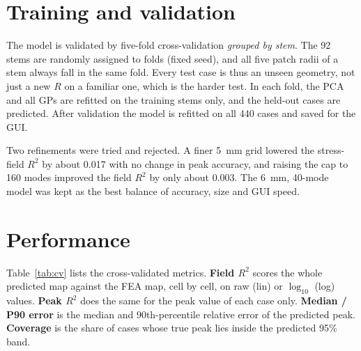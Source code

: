 \documentclass[11pt,a4paper]{article}
\begin{document}
\section{Training and validation}

The model is validated by five-fold cross-validation \emph{grouped by stem}. The 92 stems are randomly assigned to folds (fixed seed), and all five patch radii of a stem always fall in the same fold. Every test case is thus an unseen geometry, not just a new $R$ on a familiar one, which is the harder test. In each fold, the PCA and all GPs are refitted on the training stems only, and the held-out cases are predicted. After validation the model is refitted on all 440 cases and saved for the GUI.

Two refinements were tried and rejected. A finer \SI{5}{mm} grid lowered the stress-field $R^2$ by about 0.017 with no change in peak accuracy, and raising the cap to 160 modes improved the field $R^2$ by only about 0.003. The \SI{6}{mm}, 40-mode model was kept as the best balance of accuracy, size and GUI speed.

\section{Performance}

Table~\ref{tab:cv} lists the cross-validated metrics. \textbf{Field $R^2$} scores the whole predicted map against the FEA map, cell by cell, on raw (lin) or $\log_{10}$ (log) values. \textbf{Peak $R^2$} does the same for the peak value of each case only. \textbf{Median / P90 error} is the median and 90th-percentile relative error of the predicted peak. \textbf{Coverage} is the share of cases whose true peak lies inside the predicted 95\% band.
\end{document}

